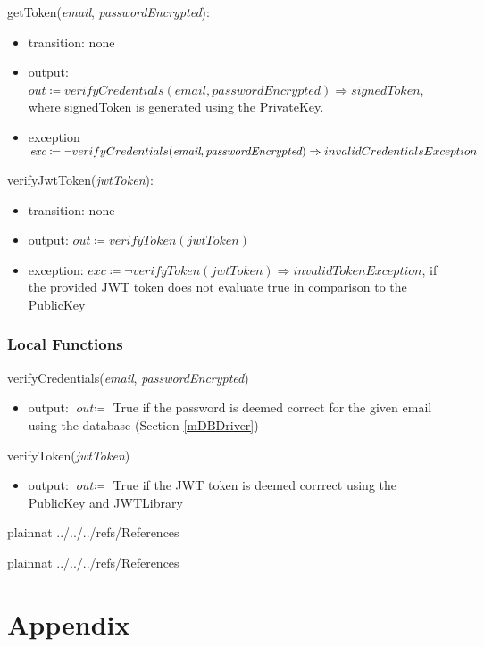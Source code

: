 \documentclass[12pt, titlepage]{article}
\begin{document}
\noindent getToken(\textit{email}, \textit{passwordEncrypted}):
\begin{itemize}
\item transition: none
\item output: \( \textit{out} \coloneqq verifyCredentials(\textit{email}, \textit{passwordEncrypted}) \Rightarrow  signedToken\), \\
where signedToken is generated using the PrivateKey.
\item exception \( \textit{exc} \coloneqq \neg verifyCredentials(\textit{email}, \textit{passwordEncrypted}) \Rightarrow \\ invalidCredentialsException\)
\end{itemize}

\noindent verifyJwtToken(\textit{jwtToken}):
\begin{itemize}
\item transition: none
\item output: \( \textit{out} \coloneqq verifyToken(\textit{jwtToken})\)
\item exception: \( \textit{exc} \coloneqq \neg verifyToken(\textit{jwtToken}) \Rightarrow invalidTokenException \), if the provided JWT token does not evaluate true in comparison to the PublicKey
\end{itemize}

\subsubsection{Local Functions}
verifyCredentials(\textit{email}, \textit{passwordEncrypted})
\begin{itemize}
\item output: \( \textit{out} \coloneqq \) True if the password is deemed correct for the given email using the database (Section \ref{mDBDriver})
\end{itemize}

\noindent verifyToken(\textit{jwtToken})
\begin{itemize}
\item output: \( \textit{out} \coloneqq \) True if the JWT token is deemed corrrect using the PublicKey and JWTLibrary
\end{itemize}

\newpage

 {plainnat}
 {../../../refs/References}

\newpage

 {plainnat}
 {../../../refs/References}

\newpage

\section{Appendix} \label{Appendix}

\end{document}
